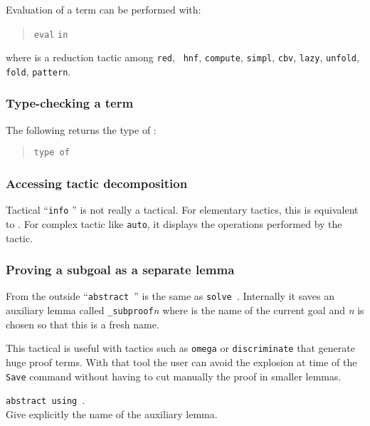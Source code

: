 Evaluation of a term can be performed with:
\begin{quote}
{\tt eval} {} {\tt in} {\term}
\end{quote}
where  is a reduction tactic among {\tt red}, {\tt
hnf}, {\tt compute}, {\tt simpl}, {\tt cbv}, {\tt lazy}, {\tt unfold},
{\tt fold}, {\tt pattern}.

\subsubsection{Type-checking a term}

The following returns the type of {\term}:

\begin{quote}
{\tt type of} {\term}
\end{quote}

\subsubsection{Accessing tactic decomposition}

Tactical ``{\tt info} {\tacexpr}'' is not really a tactical. For
elementary tactics, this is equivalent to \tacexpr. For complex tactic
like \texttt{auto}, it displays the operations performed by the
tactic.

\subsubsection{Proving a subgoal as a separate lemma}

From the outside ``\texttt{abstract \tacexpr}'' is the same as
{\tt solve \tacexpr}. Internally it saves an auxiliary lemma called 
{\ident}\texttt{\_subproof}\textit{n} where {\ident} is the name of the
current goal and \textit{n} is chosen so that this is a fresh name.

This tactical is useful with tactics such as \texttt{omega} or
\texttt{discriminate} that generate huge proof terms. With that tool
the user can avoid the explosion at time of the \texttt{Save} command
without having to cut manually the proof in smaller lemmas.

\begin{Variants}
\item \texttt{abstract {\tacexpr} using {\ident}}.\\
  Give explicitly the name of the auxiliary lemma.
\end{Variants}

